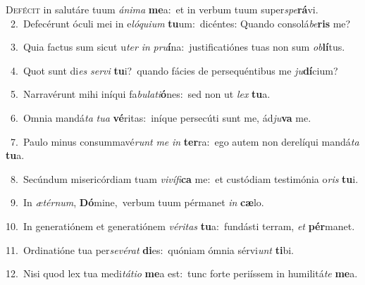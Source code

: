 \lettrine{\initial\textcolor{\initialcolor}{D}}{efécit} in salutáre tuum \textit{á}\-\textit{ni}\textit{ma} \textbf{me}\-a:~\star et in verbum tuum super\-\textit{spe}\-\textbf{rá}vi.\\
{\numbfont\textcolor{\numbcolor}{~2.}}~Defecérunt óculi mei in e\-\textit{ló}\-\textit{qui}\textit{um} \textbf{tu}\-um:~\star dicéntes: Quando consolá\-\textit{be}\-\textbf{ris} me?\par
{\numbfont\textcolor{\numbcolor}{~3.}}~Quia factus sum sicut u\textit{ter} \textit{in} \textit{pru}\-\textbf{í}na:~\star justificatiónes tuas non sum \textit{ob}\-\textbf{lí}tus.\par
{\numbfont\textcolor{\numbcolor}{~4.}}~Quot sunt di\textit{es} \textit{ser}\-\textit{vi} \textbf{tu}\-i?~\star quando fácies de persequéntibus me \textit{ju}\-\textbf{dí}cium?\par
{\numbfont\textcolor{\numbcolor}{~5.}}~Narravérunt mihi iníqui fa\-\textit{bu}\-\textit{la}\textit{ti}\textbf{ó}nes:~\star sed non ut \textit{lex} \textbf{tu}\-a.\par
{\numbfont\textcolor{\numbcolor}{~6.}}~Omnia mandá\textit{ta} \textit{tu}\-\textit{a} \textbf{vé}\-ritas:~\star iníque persecúti sunt me, ád\-\textit{ju}\-\textbf{va} me.\par
{\numbfont\textcolor{\numbcolor}{~7.}}~Paulo minus consummavé\textit{runt} \textit{me} \textit{in} \textbf{ter}\-ra:~\star ego autem non derelíqui mandá\textit{ta} \textbf{tu}\-a.\par
{\numbfont\textcolor{\numbcolor}{~8.}}~Secúndum misericórdiam tuam \textit{vi}\-\textit{ví}\textit{fi}\textbf{ca} me:~\star et custódiam testimónia o\textit{ris} \textbf{tu}\-i.\par
{\numbfont\textcolor{\numbcolor}{~9.}}~In \textit{æ}\-\textit{tér}\textit{num}, \textbf{Dó}\-mine,~\star verbum tuum pérmanet \textit{in} \textbf{cæ}\-lo.\par
{\numbfont\textcolor{\numbcolor}{10.}}~In generatiónem et generatiónem \textit{vé}\-\textit{ri}\textit{tas} \textbf{tu}\-a:~\star fundásti terram, \textit{et} \textbf{pér}\-manet.\par
{\numbfont\textcolor{\numbcolor}{11.}}~Ordinatióne tua per\-\textit{se}\-\textit{vé}\textit{rat} \textbf{di}\-es:~\star quóniam ómnia sérvi\textit{unt} \textbf{ti}\-bi.\par
{\numbfont\textcolor{\numbcolor}{12.}}~Nisi quod lex tua medi\-\textit{tá}\-\textit{ti}\textit{o} \textbf{me}\-a est:~\star tunc forte periíssem in humilitá\textit{te} \textbf{me}\-a.\par
